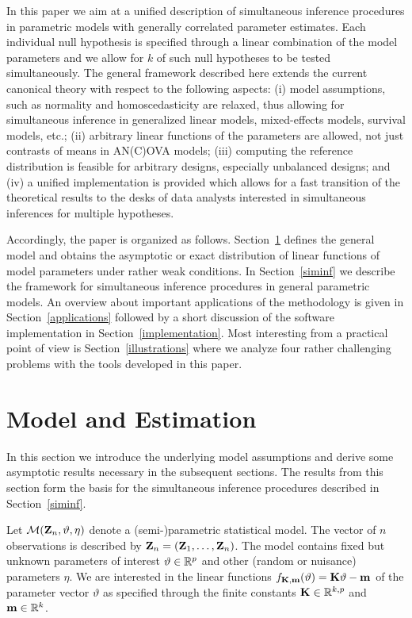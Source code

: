 \documentclass[12pt]{article}
\begin{document}
In this paper we aim at a unified description of simultaneous
inference procedures in parametric models with generally correlated parameter estimates.
Each individual null hypothesis is specified through a linear
combination of the model parameters and we allow
for $k$ of such null hypotheses to be tested simultaneously.
The general framework described here extends the current canonical theory
with respect to the following aspects: (i) model assumptions, such as normality
and homoscedasticity
are relaxed, thus allowing for simultaneous inference
in generalized linear models, mixed-effects models,
survival models, etc.; (ii) arbitrary linear functions of the
parameters are allowed, not just contrasts of means in AN(C)OVA models; (iii)
computing the reference distribution is feasible for arbitrary designs,
especially unbalanced designs; and (iv)
a unified implementation is provided which allows for a fast transition of the
theoretical results to the desks of data analysts interested
in simultaneous inferences for multiple hypotheses.

Accordingly, the paper is organized as follows.
Section~\ref{model} defines the general model and obtains
the asymptotic or exact distribution of linear functions
of model parameters under rather weak conditions.
In Section~\ref{siminf} we
describe the framework for simultaneous inference
procedures in general parametric models. An overview about important applications
of the methodology is given in Section~\ref{applications} followed
by a short discussion of the software implementation in Section~\ref{implementation}.
Most interesting from a practical point of view is
Section~\ref{illustrations} where we analyze four rather challenging
problems with the tools developed in this paper.


\section{Model and Estimation} \label{model}

In this section we introduce the underlying model assumptions
and derive some asymptotic results necessary in the subsequent sections.
The results from this section form the basis for the
simultaneous inference procedures described in Section~\ref{siminf}.

Let $\mathcal{M}(\mathbf{Z}_n, \vartheta, \eta)$ denote a (semi-)parametric statistical
model.
The vector of $n$ observations is described by $\mathbf{Z}_n = (\mathbf{Z}_1, \dots, \mathbf{Z}_n)$.
The model contains fixed
but unknown parameters of interest $\vartheta \in \mathbb{R}^p$
and other (random or nuisance) parameters $\eta$.
We are interested in the linear
functions $f_{\mathbf{K}, \mathbf{m}}(\vartheta) = \mathbf{K} \vartheta - \mathbf{m}$
of the parameter vector $\vartheta$ as specified through the finite
constants $\mathbf{K} \in \mathbb{R}^{k, p}$
and $\mathbf{m} \in \mathbb{R}^k$.
\end{document}

